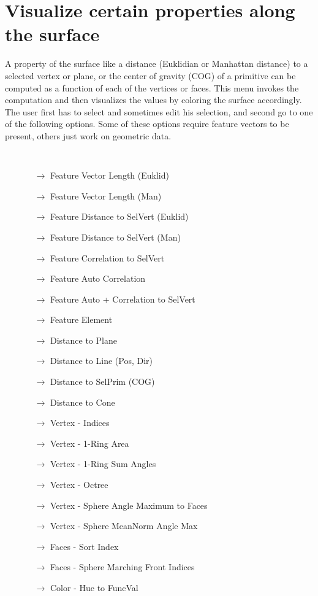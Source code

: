 \section{Visualize certain properties along the surface}\label{functions} 
A property of the surface like a distance (Euklidian or Manhattan distance) to a selected vertex or plane, or the center of gravity (COG) of a primitive can be computed as a function of each of the vertices or faces. This menu invokes the computation and then  visualizes the values by coloring the surface accordingly. The user first has to select and sometimes edit his selection, and second go to one of the following options. Some of these options require feature vectors to be present, others just work on geometric data.
{\tt
\begin{itemize}
\item[] 
  \begin{itemize}
  \item[$\rightarrow$] Feature Vector Length (Euklid)
  \item[$\rightarrow$] Feature Vector Length (Man)
  \color{gray}
  \item[$\rightarrow$] Feature Distance to SelVert (Euklid)
  \item[$\rightarrow$] Feature Distance to SelVert (Man)
  \item[$\rightarrow$] Feature Correlation to SelVert
  \color{black}
  \item[$\rightarrow$] Feature Auto Correlation
  \color{gray}  
  \item[$\rightarrow$] Feature Auto + Correlation to SelVert
  \color{black}  
  \item[$\rightarrow$] Feature Element
  \item[$\rightarrow$] Distance to Plane
  \item[$\rightarrow$] Distance to Line (Pos, Dir)
  \item[$\rightarrow$] Distance to SelPrim (COG) 
  \item[$\rightarrow$] Distance to Cone 
  \item[$\rightarrow$] Vertex - Indices
  \item[$\rightarrow$] Vertex - 1-Ring Area
  \item[$\rightarrow$] Vertex - 1-Ring Sum Angles
  \item[$\rightarrow$] Vertex - Octree
  \item[$\rightarrow$] Vertex - Sphere Angle Maximum to Faces
  \item[$\rightarrow$] Vertex - Sphere MeanNorm Angle Max
  \item[$\rightarrow$] Faces - Sort Index
  \item[$\rightarrow$] Faces - Sphere Marching Front Indices
  \item[$\rightarrow$] Color - Hue to FuncVal  
  \end{itemize}
\end{itemize}
}


